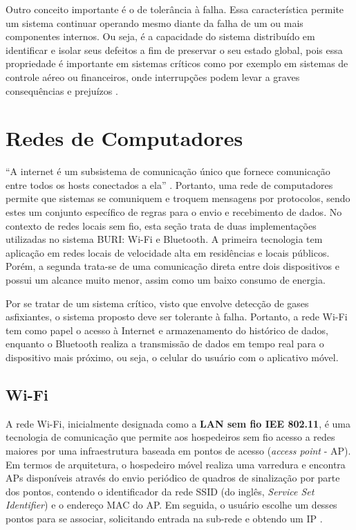 Outro conceito importante é o de tolerância à falha. Essa característica permite um sistema continuar operando mesmo diante da falha de um ou mais 
componentes internos. Ou seja, é a capacidade do sistema distribuído em identificar e isolar seus defeitos a fim de preservar o seu estado global, pois essa propriedade é 
importante em sistemas críticos como por exemplo em sistemas de controle aéreo ou financeiros, onde interrupções podem levar a graves consequências e prejuízos \cite[pp. 528]{sistemas-distribuidos-coulouris2013}.

\section{Redes de Computadores}

``A internet é um subsistema de comunicação único que fornece comunicação entre todos os hosts conectados a ela'' \cite[pp. 96]{sistemas-distribuidos-coulouris2013}. Portanto, uma rede de computadores 
permite que sistemas se comuniquem e troquem mensagens por protocolos, sendo estes um conjunto específico de regras para o envio e recebimento de dados. No contexto de redes locais sem fio, esta seção trata de duas 
implementações utilizadas no sistema BURI: Wi-Fi e Bluetooth. A primeira tecnologia tem aplicação em redes locais de velocidade alta em residências e locais públicos. Porém, a segunda trata-se de uma comunicação direta entre dois 
dispositivos e possui um alcance muito menor, assim como um baixo consumo de energia.

Por se tratar de um sistema crítico, visto que envolve detecção de gases asfixiantes, o sistema proposto deve ser tolerante à falha. Portanto, a rede Wi-Fi tem como papel o acesso à Internet e armazenamento do histórico de dados, enquanto o 
Bluetooth realiza a transmissão de dados em tempo real para o dispositivo mais próximo, ou seja, o celular do usuário com o aplicativo móvel.

\subsection{Wi-Fi}

A rede Wi-Fi, inicialmente designada como a \textbf{LAN sem fio IEE 802.11}, é uma tecnologia de comunicação 
que permite aos hospedeiros sem fio acesso a redes maiores por uma infraestrutura baseada em pontos de acesso (\textit{access point} - AP). Em termos 
de arquitetura, o hospedeiro móvel realiza uma varredura e encontra APs disponíveis através do envio periódico de quadros de sinalização por parte dos pontos, contendo o identificador da 
rede SSID (do inglês, \textit{Service Set Identifier}) e o endereço MAC do AP. Em seguida, o usuário escolhe um desses pontos para 
se associar, solicitando entrada na sub-rede e obtendo um IP \cite{redeskurose2010}. 

